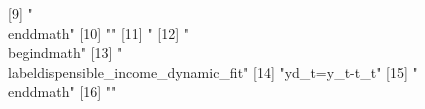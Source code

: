  [9] "\\end{dmath}"                                                                                                                                                                                                                                                                                                                                
[10] ""                                                                                                                                                                                                                                                                                                                                            
[11] "%
[12] "\\begin{dmath}"                                                                                                                                                                                                                                                                                                                              
[13] "\\label{dispensible_income_dynamic_fit}"                                                                                                                                                                                                                                                                                                     
[14] "{yd_{t}}={y_{t}}-{t_{t}}"                                                                                                                                                                                                                                                                                                                    
[15] "\\end{dmath}"                                                                                                                                                                                                                                                                                                                                
[16] ""                                                                                                                                                                                                                                                                                                                                            
